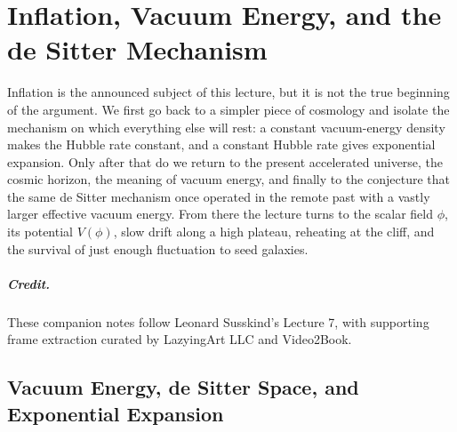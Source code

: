 \chapter{Inflation, Vacuum Energy, and the de Sitter Mechanism}

Inflation is the announced subject of this lecture, but it is not the true beginning of the argument. We first go back to a simpler piece of cosmology and isolate the mechanism on which everything else will rest: a constant vacuum-energy density makes the Hubble rate constant, and a constant Hubble rate gives exponential expansion. Only after that do we return to the present accelerated universe, the cosmic horizon, the meaning of vacuum energy, and finally to the conjecture that the same de Sitter mechanism once operated in the remote past with a vastly larger effective vacuum energy. From there the lecture turns to the scalar field \(\phi\), its potential \(V(\phi)\), slow drift along a high plateau, reheating at the cliff, and the survival of just enough fluctuation to seed galaxies.

\paragraph{Credit.} These companion notes follow Leonard Susskind's Lecture 7, with supporting frame extraction curated by LazyingArt LLC and Video2Book.

\section{Vacuum Energy, de Sitter Space, and Exponential Expansion}

